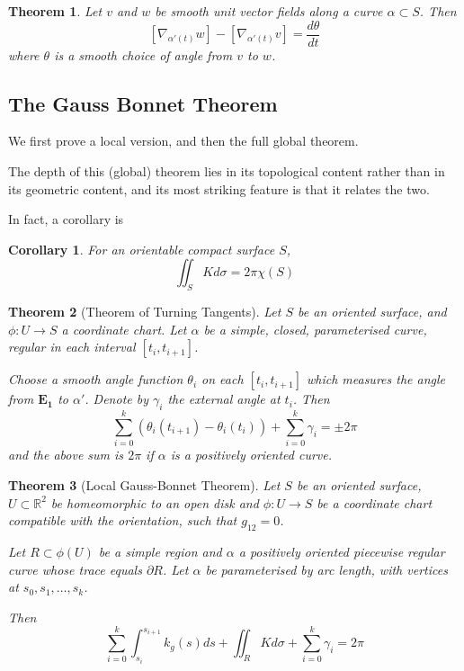 \documentclass[10pt, oneside, reqno]{amsart}
\newcommand{\R}{\mathbb{R}}
\theoremstyle{plain}%
\newtheorem{thm}{Theorem}[section]
\newtheorem*{cor}{Corollary}
\theoremstyle{definition}
\theoremstyle{remark}
\begin{document}
\begin{thm}
    Let $v$ and $w$ be smooth \emph{unit} vector fields along a curve $\alpha \subset S$.  Then \[[ \nabla_{\alpha'(t)} w] - [  \nabla_{\alpha'(t)} v] = \frac{d \theta}{dt} \]
    where $\theta$ is a smooth choice of angle from $v$ to $w$.
\end{thm}

\subsection{The Gauss Bonnet Theorem}
We first prove a local version, and then the full global theorem.

The depth of this (global) theorem lies in its topological content rather than in its geometric content, and its most striking feature is that it relates the two.

In fact, a corollary is

\begin{cor}
    For an orientable compact surface $S$, \[ \iint_S K d \sigma = 2 \pi \chi(S) \]
\end{cor}

\begin{thm}[Theorem of Turning Tangents]
    Let $S$ be an oriented surface, and $\phi : U \rightarrow S$ a coordinate chart.  Let $\alpha$ be a simple, closed, parameterised curve, regular in each interval $[ t_i, t_{i+1}]$. 
    
    Choose a smooth angle function $\theta_i$ on each $[t_i, t_{i+1}]$ which measures the angle from $\mathbf{E_1}$ to $\alpha'$.  Denote by $\gamma_i$ the external angle at $t_i$.  Then \[
        \sum_{i=0}^k (\theta_i(t_{i+1})- \theta_i(t_i)) + \sum_{i = 0}^k \gamma_i = \pm 2 \pi
    \]
    and the above sum is $2 \pi$ if $\alpha $ is a positively oriented curve.
\end{thm}

\begin{thm}[Local Gauss-Bonnet Theorem]
    Let $S$ be an oriented surface, $U \subset \R^2$ be homeomorphic to an open disk and $\phi: U \rightarrow S$ be a coordinate chart compatible with the orientation, such that $g_{12} = 0$.
    
    Let $R \subset \phi(U)$ be a simple region and $\alpha$ a positively oriented piecewise regular curve whose trace equals $\partial R$. Let $\alpha$ be parameterised by arc length, with vertices at $s_0, s_1, \dots, s_k$.
    
    Then \[
        \sum_{i=0}^k \int_{s_i}^{s_{i+1}} k_g(s) ds + \iint_R K d \sigma + \sum_{i = 0}^k \gamma_i = 2 \pi
    \]
\end{thm}
\end{document}
